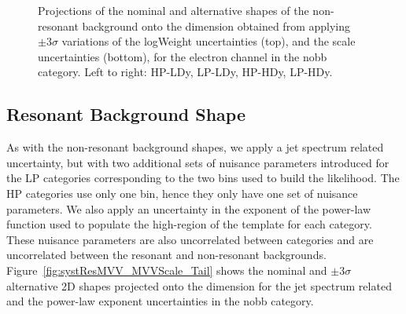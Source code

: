 \begin{figure}[htbp]
  \caption{
    Projections of the nominal and alternative shapes of the non-resonant background onto the \MJ dimension obtained from applying $\pm3\sigma$ variations of the logWeight uncertainties (top), and the \MJ scale uncertainties (bottom), for the electron channel in the nobb category.
    Left to right: HP-LDy, LP-LDy, HP-HDy, LP-HDy.
  }
  \label{fig:systNonResMJ_logWeight_Scale}
\end{figure}

\subsection{Resonant Background Shape}

As with the non-resonant background shapes, we apply a jet \pt spectrum related uncertainty, but with two additional sets of nuisance parameters introduced for the LP categories corresponding to the two \MJ bins used to build the \MVV likelihood.
The HP categories use only one \MJ bin, hence they only have one set of nuisance parameters.
We also apply an uncertainty in the exponent of the power-law function used to populate the high-\MVV region of the template for each category.
These nuisance parameters are also uncorrelated between categories and are uncorrelated between the resonant and non-resonant backgrounds.
Figure~\ref{fig:systResMVV_MVVScale_Tail} shows the nominal and $\pm3\sigma$ alternative 2D shapes projected onto the \MVV dimension for the jet \pt spectrum related and the \MVV power-law exponent uncertainties in the nobb category.

